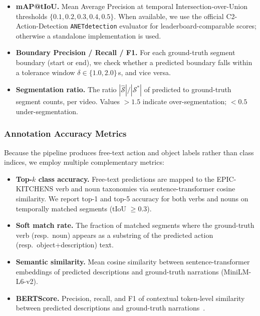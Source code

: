 \documentclass[10pt,twocolumn]{article}
\begin{document}
\begin{itemize}[leftmargin=*,itemsep=2pt]
  \item \textbf{mAP@tIoU.}
    Mean Average Precision at temporal Intersection-over-Union
    thresholds $\{0.1, 0.2, 0.3, 0.4, 0.5\}$.
    When available, we use the official C2-Action-Detection
    \texttt{ANETdetection} evaluator for leaderboard-comparable
    scores; otherwise a standalone implementation is used.

  \item \textbf{Boundary Precision / Recall / F1.}
    For each ground-truth segment boundary (start or end), we check
    whether a predicted boundary falls within a tolerance window
    $\delta \in \{1.0, 2.0\}$\,s, and vice versa.

  \item \textbf{Segmentation ratio.}
    The ratio $|\hat{\mathcal{S}}| / |\mathcal{S}^*|$ of predicted
    to ground-truth segment counts, per video.  Values $> 1.5$
    indicate over-segmentation; $< 0.5$ under-segmentation.
\end{itemize}

\subsubsection{Annotation Accuracy Metrics}

Because the pipeline produces free-text action and object labels
rather than class indices, we employ multiple complementary metrics:

\begin{itemize}[leftmargin=*,itemsep=2pt]
  \item \textbf{Top-$k$ class accuracy.}
    Free-text predictions are mapped to the EPIC-KITCHENS verb and
    noun taxonomies via sentence-transformer cosine similarity.
    We report top-1 and top-5 accuracy for both verbs and nouns
    on temporally matched segments (tIoU $\geq 0.3$).

  \item \textbf{Soft match rate.}
    The fraction of matched segments where the ground-truth verb
    (resp.\ noun) appears as a substring of the predicted
    action (resp.\ object+description) text.

  \item \textbf{Semantic similarity.}
    Mean cosine similarity between sentence-transformer embeddings
    of predicted descriptions and ground-truth narrations
    (MiniLM-L6-v2).

  \item \textbf{BERTScore.}
    Precision, recall, and F1 of contextual token-level similarity
    between predicted descriptions and ground-truth
    narrations~\cite{zhang2020bertscore}.
\end{itemize}
\end{document}
